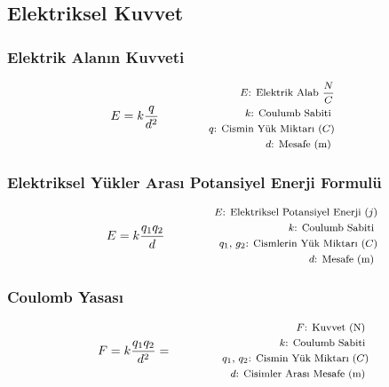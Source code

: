 \subsection{Elektriksel Kuvvet}

\subsubsection*{Elektrik Alanın Kuvveti}
\begin{equation}
    E = k\frac{q}{d^2} \qquad \qquad \parbox{4cm}{\footnotesize$\begin{aligned}
        E\text{: Elektrik Alab } \frac{N}{C} \\
        k\text{: Coulumb Sabiti } \\
        q\text{: Cismin Yük Miktarı } (C) \\
        d\text{: Mesafe (m) }
\end{aligned}$}
\end{equation}

\subsubsection*{Elektriksel Yükler Arası Potansiyel Enerji Formulü}
\begin{equation}
    E = k \frac{q_1 q_2}{d} \qquad \qquad \parbox{4cm}{\footnotesize$\begin{aligned}
        E\text{: Elektriksel Potansiyel Enerji } (j) \\
        k\text{: Coulumb Sabiti } \\
        q_1\text{, }g_2\text{: Cismlerin Yük Miktarı } (C) \\
        d\text{: Mesafe (m) }
\end{aligned}$}
\end{equation}

\subsubsection*{Coulomb Yasası}
\begin{equation}
    F = k\frac{q_1 q_2}{d^2} = \qquad \qquad \parbox{4cm}{\footnotesize$\begin{aligned}
        F\text{: Kuvvet (N) } \\
        k\text{: Coulumb Sabiti } \\
        q_1\text{, }q_2\text{: Cismin Yük Miktarı } (C) \\
        d\text{: Cisimler Arası Mesafe (m) }
\end{aligned}$}
\end{equation}


